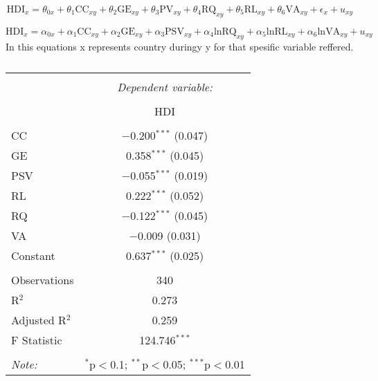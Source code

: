 \documentclass[
  12pt,
]{article}
\begin{document}
\[
\text{HDI}_x = \theta_{0x} + \theta_1 \text{CC}_{xy} + \theta_2 \text{GE}_{xy} + \theta_3 \text{PV}_{xy} + \theta_4 \text{RQ}_{xy} + \theta_5 \text{RL}_{xy} + \theta_6 \text{VA}_{xy} + \epsilon_x + u_{xy}
\]

\[
\text{HDI}_x = \alpha_{0x} + \alpha_1 \text{CC}_{xy} + \alpha_2 \text{GE}_{xy} + \alpha_3 \text{PSV}_{xy} + \alpha_4 \text{lnRQ}_{xy} + \alpha_5 \text{lnRL}_{xy} + \alpha_6 \text{lnVA}_{xy} + u_{xy}
\]
In this equations x represents country duringy y for that spesific variable reffered.

\begin{table}[!htbp] \centering 
  \caption{} 
  \label{} 
\begin{tabular}{@{\extracolsep{5pt}}lc} 
\\[-1.8ex]\hline 
\hline \\[-1.8ex] 
 & \multicolumn{1}{c}{\textit{Dependent variable:}} \\ 
\cline{2-2} 
\\[-1.8ex] & HDI \\ 
\hline \\[-1.8ex] 
 CC & $-$0.200$^{***}$ (0.047) \\ 
  GE & 0.358$^{***}$ (0.045) \\ 
  PSV & $-$0.055$^{***}$ (0.019) \\ 
  RL & 0.222$^{***}$ (0.052) \\ 
  RQ & $-$0.122$^{***}$ (0.045) \\ 
  VA & $-$0.009 (0.031) \\ 
  Constant & 0.637$^{***}$ (0.025) \\ 
 \hline \\[-1.8ex] 
Observations & 340 \\ 
R$^{2}$ & 0.273 \\ 
Adjusted R$^{2}$ & 0.259 \\ 
F Statistic & 124.746$^{***}$ \\ 
\hline 
\hline \\[-1.8ex] 
\textit{Note:}  & \multicolumn{1}{r}{$^{*}$p$<$0.1; $^{**}$p$<$0.05; $^{***}$p$<$0.01} \\ 
\end{tabular} 
\end{table}
\end{document}
